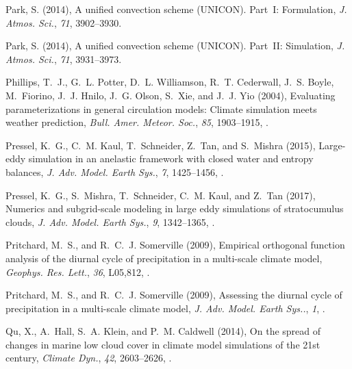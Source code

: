 \documentclass[draft]{agujournal}
\begin{document}
\begin{thebibliography}{196}
Park, S. (2014{}), A unified convection scheme ({UNICON}).
  {Part~I}: {F}ormulation, \textit{J. Atmos. Sci.}, \textit{71}, 3902--3930.

Park, S. (2014{}), A unified convection scheme ({UNICON}).
  {Part~II}: Simulation, \textit{J. Atmos. Sci.}, \textit{71}, 3931--3973.

Phillips, T.~J., G.~L. Potter, D.~L. Williamson, R.~T. Cederwall, J.~S. Boyle,
  M.~Fiorino, J.~J. Hnilo, J.~G. Olson, S.~Xie, and J.~J. Yio (2004),
  Evaluating parameterizations in general circulation models: Climate
  simulation meets weather prediction, \textit{Bull. Amer. Meteor. Soc.},
  \textit{85}, 1903--1915, .

Pressel, K.~G., C.~M. Kaul, T.~Schneider, Z.~Tan, and S.~Mishra (2015),
  Large-eddy simulation in an anelastic framework with closed water and entropy
  balances, \textit{J. Adv. Model. Earth Sys.}, \textit{7}, 1425--1456,
  .

Pressel, K.~G., S.~Mishra, T.~Schneider, C.~M. Kaul, and Z.~Tan (2017),
  Numerics and subgrid-scale modeling in large eddy simulations of
  stratocumulus clouds, \textit{J. Adv. Model. Earth Sys.}, \textit{9},
  1342--1365, .

Pritchard, M.~S., and R.~C.~J. Somerville (2009{}), Empirical
  orthogonal function analysis of the diurnal cycle of precipitation in a
  multi-scale climate model, \textit{Geophys. Res. Lett.}, \textit{36},
  L05,812, .

Pritchard, M.~S., and R.~C.~J. Somerville (2009{}), Assessing the
  diurnal cycle of precipitation in a multi-scale climate model, \textit{J.
  Adv. Model. Earth Sys..}, \textit{1}, .

Qu, X., A.~Hall, S.~A. Klein, and P.~M. Caldwell (2014), On the spread of
  changes in marine low cloud cover in climate model simulations of the 21st
  century, \textit{Climate Dyn.}, \textit{42}, 2603--2626,
  .


\end{thebibliography}
\end{document}
